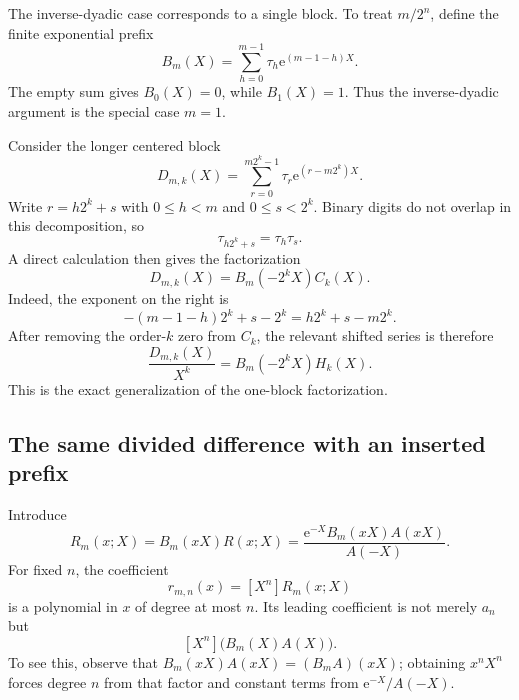 \documentclass[11pt,oneside]{article}
\theoremstyle{definition}
\theoremstyle{remark}
\newcommand{\coeff}[2]{\left[#1^{#2}\right]}
\newcommand{\e}{\mathrm e}
\newcommand{\tm}{\tau}
\begin{document}
The inverse-dyadic case corresponds to a single block.  To treat
$m/2^n$, define the finite exponential prefix
\begin{equation}\label{eq:Bmdef}
 B_m(X)=\sum_{h=0}^{m-1}\tm_h\e^{(m-1-h)X}.
\end{equation}
The empty sum gives $B_0(X)=0$, while $B_1(X)=1$.  Thus the inverse-dyadic
argument is the special case $m=1$.

Consider the longer centered block
\begin{equation}\label{eq:Dmkdef}
 D_{m,k}(X)=
 \sum_{r=0}^{m2^k-1}\tm_r\e^{(r-m2^k)X}.
\end{equation}
Write $r=h2^k+s$ with $0\le h<m$ and $0\le s<2^k$.  Binary digits do not
overlap in this decomposition, so
\begin{equation}\label{eq:tmblockmultiplicative}
 \tm_{h2^k+s}=\tm_h\tm_s.
\end{equation}
A direct calculation then gives the factorization
\begin{equation}\label{eq:Dfactor}
 \boxed{D_{m,k}(X)=B_m(-2^kX)C_k(X).}
\end{equation}
Indeed, the exponent on the right is
\[
 -(m-1-h)2^k+s-2^k=h2^k+s-m2^k.
\]
After removing the order-$k$ zero from $C_k$, the relevant shifted series is
therefore
\begin{equation}\label{eq:Dshiftedfactor}
 \frac{D_{m,k}(X)}{X^k}=B_m(-2^kX)H_k(X).
\end{equation}
This is the exact generalization of the one-block factorization.

\subsection{The same divided difference with an inserted prefix}

Introduce
\begin{equation}\label{eq:Smparam}
 R_m(x;X)=B_m(xX)R(x;X)
 =\frac{\e^{-X}B_m(xX)A(xX)}{A(-X)}.
\end{equation}
For fixed $n$, the coefficient
\[
 r_{m,n}(x)=\coeff{X}{n}R_m(x;X)
\]
is a polynomial in $x$ of degree at most $n$.  Its leading coefficient is
not merely $a_n$ but
\begin{equation}\label{eq:rmnleading}
 \coeff{X}{n}\bigl(B_m(X)A(X)\bigr).
\end{equation}
To see this, observe that
$B_m(xX)A(xX)=(B_mA)(xX)$; obtaining $x^nX^n$ forces degree $n$ from that
factor and constant terms from $\e^{-X}/A(-X)$.
\end{document}
